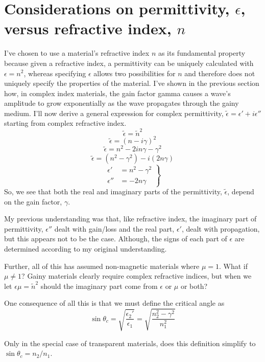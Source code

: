 \documentclass[10pt,a4paper]{article}
\begin{document}
\section{Considerations on permittivity, $\epsilon$, versus refractive index, $n$}
I've chosen to use a material's refractive index $n$ as its fundamental property because given a refractive index, a permittivity can be uniquely calculated with $\epsilon=n^2$, whereas specifying $\epsilon$ allows two possibilities for $n$ and therefore does not uniquely specify the properties of the material.
I've shown in the previous section how, in complex index materials, the gain factor gamma causes a wave's amplitude to grow exponentially as the wave propagates through the gainy medium. I'll now derive a general expression for complex permittivity, $\tilde{\epsilon}=\epsilon'+i\epsilon''$ starting from complex refractive index.
\begin{equation}
\tilde{\epsilon}=\tilde{n}^2
\end{equation}
\begin{equation}
\tilde{\epsilon}=(n-i\gamma)^2
\end{equation}
\begin{equation}
\tilde{\epsilon}=n^2-2in\gamma-\gamma^2
\end{equation}
\begin{equation}
\tilde{\epsilon}=(n^2-\gamma^2)-i(2n\gamma)
\end{equation}
\begin{equation}
\left.
\begin{aligned}
\epsilon'&=n^2-\gamma^2 \\
\epsilon''&=-2n\gamma
\end{aligned}
\right\}
\end{equation}
So, we see that both the real and imaginary parts of the permittivity, $\tilde{\epsilon}$, depend on the gain factor, $\gamma$.

My previous understanding was that, like refractive index, the imaginary part of permittivity, $\epsilon''$ dealt with gain/loss and the real part, $\epsilon'$, dealt with propagation, but this appears not to be the case. Although, the signs of each part of $\epsilon$ are determined according to my original understanding.

Further, all of this has assumed non-magnetic materials where $\mu=1$. What if $\mu\neq1$?  Gainy materials clearly require complex refractive indices, but when we let $\epsilon\mu=\tilde{n}^2$ should the imaginary part come from $\epsilon$ or $\mu$ or both?

One consequence of all this is that we must define the critical angle as
\begin{equation}
\sin\theta_c = \sqrt{\frac{\epsilon_2'}{\epsilon_1}}=\sqrt{\frac{n_2^2-\gamma^2}{n_1^2}}
\end{equation}

Only in the special case of transparent materials, does this definition simplify to $\sin\theta_c=n_2/n_1$.
\end{document}
